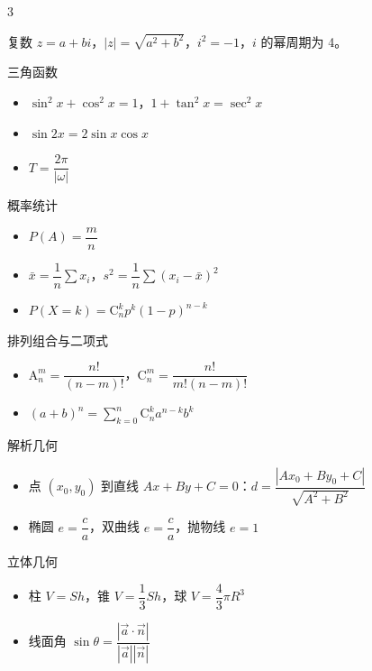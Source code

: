 \begin{multicols}{3}
\begin{fastcard}{复数}
$z=a+bi$，$|z|=\sqrt{a^2+b^2}$，$i^2=-1$，$i$ 的幂周期为 4。
\end{fastcard}

\begin{fastcard}{三角函数}
\begin{itemize}[leftmargin=1.2em, topsep=0.2ex, itemsep=0.1ex, parsep=0pt]
\item $\sin^2x+\cos^2x=1$，$1+\tan^2x=\sec^2x$
\item $\sin2x=2\sin x\cos x$
\item $T=\dfrac{2\pi}{|\omega|}$
\end{itemize}
\end{fastcard}

\begin{fastcard}{概率统计}
\begin{itemize}[leftmargin=1.2em, topsep=0.2ex, itemsep=0.1ex, parsep=0pt]
\item $P(A)=\dfrac{m}{n}$
\item $\bar x=\dfrac1n\sum x_i$，$s^2=\dfrac1n\sum(x_i-\bar x)^2$
\item $P(X=k)=\mathrm C_n^k p^k(1-p)^{n-k}$
\end{itemize}
\end{fastcard}

\begin{fastcard}{排列组合与二项式}
\begin{itemize}[leftmargin=1.2em, topsep=0.2ex, itemsep=0.1ex, parsep=0pt]
\item $\mathrm A_n^m=\dfrac{n!}{(n-m)!}$，$\mathrm C_n^m=\dfrac{n!}{m!(n-m)!}$
\item $(a+b)^n=\sum\limits_{k=0}^{n}\mathrm C_n^k a^{n-k}b^k$
\end{itemize}
\end{fastcard}

\begin{fastcard}{解析几何}
\begin{itemize}[leftmargin=1.2em, topsep=0.2ex, itemsep=0.1ex, parsep=0pt]
\item 点 $(x_0,y_0)$ 到直线 $Ax+By+C=0$：$d=\dfrac{|Ax_0+By_0+C|}{\sqrt{A^2+B^2}}$
\item 椭圆 $e=\dfrac ca$，双曲线 $e=\dfrac ca$，抛物线 $e=1$
\end{itemize}
\end{fastcard}

\begin{fastcard}{立体几何}
\begin{itemize}[leftmargin=1.2em, topsep=0.2ex, itemsep=0.1ex, parsep=0pt]
\item 柱 $V=Sh$，锥 $V=\dfrac13Sh$，球 $V=\dfrac43\pi R^3$
\item 线面角 $\sin\theta=\dfrac{|\vec a\cdot\vec n|}{|\vec a||\vec n|}$
\end{itemize}
\end{fastcard}


\end{multicols}
